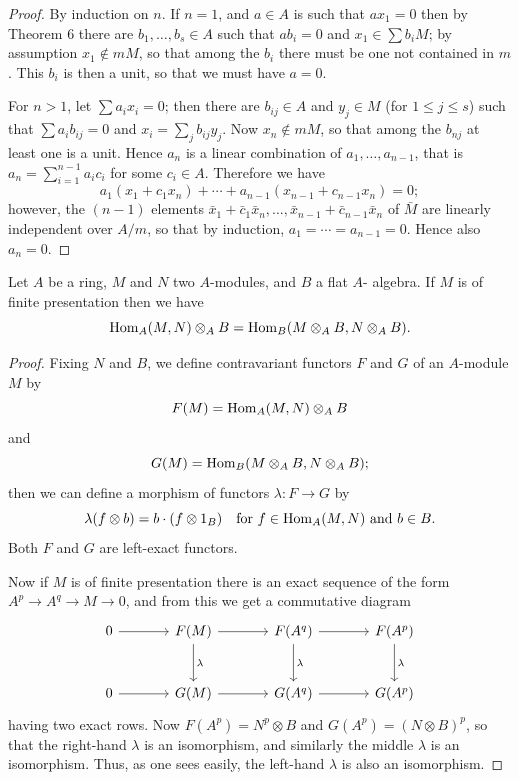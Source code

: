 \begin{proof}
By induction on $n$. If $n = 1$, and $a \in A$ is such that $ax_1 = 0$ then
by Theorem 6 there are $b_1, \ldots, b_s \in A$ such that $ab_i = 0$ and $x_1 \in \sum b_iM$; by
assumption $x_1 \notin mM$, so that among the $b_i$ there must be one not contained
in $m$. This $b_i$ is then a unit, so that we must have $a = 0$.

For $n > 1$, let $\sum a_ix_i = 0$; then there are $b_{ij} \in A$ and $y_j \in M$ (for $1 \le j \le s$)
such that $\sum a_ib_{ij} = 0$ and $x_i = \sum_j b_{ij}y_j$. Now $x_n \notin mM$, so that among the $b_{nj}$ at
least one is a unit. Hence $a_n$ is a linear combination of $a_1, \ldots, a_{n-1}$, that
is $a_n = \sum_{i=1}^{n-1} a_ic_i$ for some $c_i \in A$. Therefore we have
\[
  a_1(x_1 + c_1x_n) + \cdots + a_{n-1}(x_{n-1} + c_{n-1}x_n) = 0;
\]
however, the $(n - 1)$ elements $\bar{x}_1 + \bar{c}_1\bar{x}_n, \ldots, \bar{x}_{n-1} + \bar{c}_{n-1}\bar{x}_n$ of $\bar{M}$ are
linearly independent over $A/m$, so that by induction, $a_1 = \cdots = a_{n-1} = 0$. Hence also
$a_n = 0$.
\end{proof}

\begin{theorem}\label{thm:7.11}
Let $A$ be a ring, $M$ and $N$ two $A$-modules, and $B$ a flat $A$-
algebra. If $M$ is of finite presentation then we have
\[
  \operatorname{Hom}_A(M, N) \otimes_A B = \operatorname{Hom}_B(M \otimes_A B, N \otimes_A B).
\]
\end{theorem}

\begin{proof}
Fixing $N$ and $B$, we define contravariant functors $F$ and $G$ of an
$A$-module $M$ by
\[
  F(M) = \operatorname{Hom}_A(M, N) \otimes_A B
\]
and
\[
  G(M) = \operatorname{Hom}_B(M \otimes_A B, N \otimes_A B);
\]
then we can define a morphism of functors $\lambda\colon F \to G$ by
\[
  \lambda(f \otimes b) = b \cdot (f \otimes 1_B) \quad \text{for } f \in \operatorname{Hom}_A(M, N) \text{ and } b \in B.
\]
Both $F$ and $G$ are left-exact functors.

Now if $M$ is of finite presentation there is an exact sequence of the form
$A^p \to A^q \to M \to 0$, and from this we get a commutative diagram
\[
  \begin{tikzcd}[column sep=large, row sep=large]
    0 \arrow[r] & F(M) \arrow[r] \arrow[d, "\lambda"] & F(A^q) \arrow[r] \arrow[d, "\lambda"] & F(A^p) \arrow[d, "\lambda"] \\
    0 \arrow[r] & G(M) \arrow[r] & G(A^q) \arrow[r] & G(A^p)
  \end{tikzcd}
\]
having two exact rows. Now $F(A^p) = N^p \otimes B$ and $G(A^p) = (N \otimes B)^p$, so that
the right-hand $\lambda$ is an isomorphism, and similarly the middle $\lambda$ is an
isomorphism. Thus, as one sees easily, the left-hand $\lambda$ is also an
isomorphism.
\end{proof}

